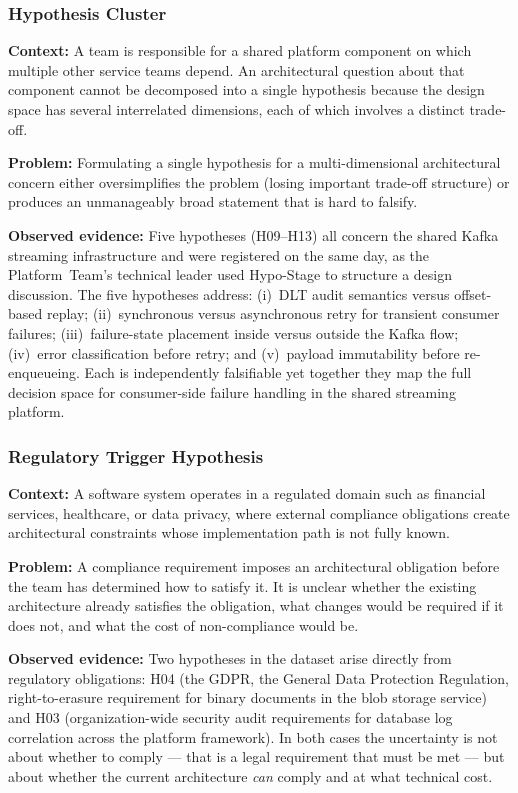 \subsubsection{Hypothesis Cluster}
\label{subsubsec:pattern-b1}

\textbf{Context:} A team is responsible for a shared platform component on which
multiple other service teams depend. An architectural question about that
component cannot be decomposed into a single hypothesis because the design space
has several interrelated dimensions, each of which involves a distinct trade-off.

\textbf{Problem:} Formulating a single hypothesis for a multi-dimensional
architectural concern either oversimplifies the problem (losing important
trade-off structure) or produces an unmanageably broad statement that is hard
to falsify.

\textbf{Observed evidence:} Five hypotheses (H09–H13) all concern the shared
Kafka streaming infrastructure and were registered on the same day, as the
Platform~Team's technical leader used Hypo-Stage to structure a design discussion.
The five hypotheses address: (i)~DLT audit semantics versus offset-based replay;
(ii)~synchronous versus asynchronous retry for transient consumer failures;
(iii)~failure-state placement inside versus outside the Kafka flow;
(iv)~error classification before retry; and (v)~payload immutability before
re-enqueueing. Each is independently falsifiable yet together they map the full
decision space for consumer-side failure handling in the shared streaming
platform.

\subsubsection{Regulatory Trigger Hypothesis}
\label{subsubsec:pattern-b2}
\textbf{Context:} A software system operates in a regulated domain such as financial
services, healthcare, or data privacy, where external compliance obligations
create architectural constraints whose implementation path is not fully known.

\textbf{Problem:} A compliance requirement imposes an architectural obligation
before the team has determined how to satisfy it. It is unclear whether the
existing architecture already satisfies the obligation, what changes would be
required if it does not, and what the cost of non-compliance would be.

\textbf{Observed evidence:} Two hypotheses in the dataset arise directly from
regulatory obligations: H04 (the GDPR, the General Data Protection Regulation, right-to-erasure requirement for binary
documents in the blob storage service) and H03 (organization-wide security
audit requirements for database log correlation across the platform framework).
In both cases the uncertainty is not about whether to comply — that is a legal
requirement that must be met — but about whether the current architecture \textit{can} comply and at
what technical cost.

